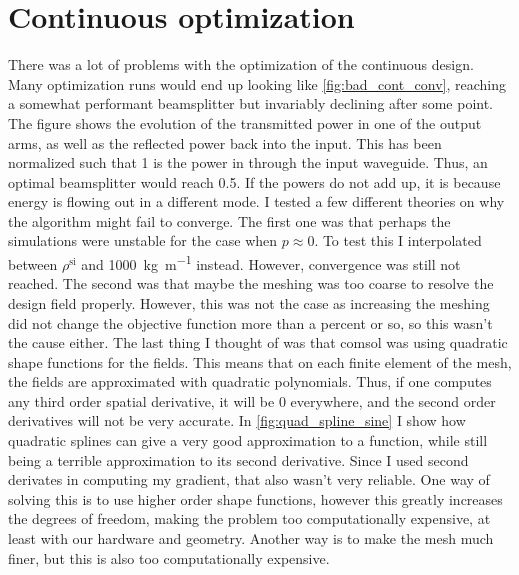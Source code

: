 \section{Continuous optimization}\label{sec:res_cont}

There was a lot of problems with the optimization of the continuous design.
Many optimization runs would end up looking like \cref{fig:bad_cont_conv},
reaching a somewhat performant beamsplitter but invariably declining after some
point.
The figure shows the evolution of the transmitted power in one of the
output arms, as well as the reflected power back into the input.
This has been normalized such that 1 is the power in through the input waveguide.
Thus, an optimal beamsplitter would reach 0.5.
If the powers do not add up, it is because energy is flowing out in a different
mode.
I tested a few different theories on why the algorithm might fail to converge.
The first one was that perhaps the simulations were unstable for the case when
$p\approx 0$. To test this I interpolated between $\rho^\text{si}$ and
\qty{1000}{\kg\per\m} instead. However, convergence was still not reached.
The second was that maybe the meshing was too coarse to resolve the design
field properly. However, this was not the case as increasing the meshing did not
change the objective function more than a percent or so, so this wasn't the
cause either.
The last thing I thought of was that comsol was using quadratic shape functions
for the fields. This means that on each finite element of the mesh, the fields
are approximated with quadratic polynomials. Thus, if one computes any third
order spatial derivative, it will be 0 everywhere, and the second order
derivatives will not be very accurate.
In \cref{fig:quad_spline_sine} I show how quadratic splines can give a very good
approximation to a function, while still being a terrible approximation to its
second derivative.
Since I used second derivates in computing my gradient, that also wasn't very
reliable.
One way of solving this is to use higher order shape functions, however this
greatly increases the degrees of freedom, making the problem too computationally
expensive, at least with our hardware and geometry.
Another way is to make the mesh much finer, but this is also too computationally
expensive.
